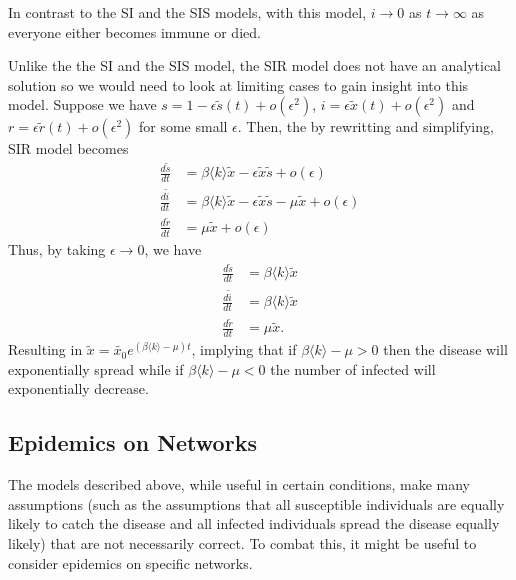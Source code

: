 \documentclass[
]{article}
\theoremstyle{definition}
\theoremstyle{definition}
\begin{document}
In contrast to the SI and the SIS models, with this model, \(i \to 0\)
as \(t \to \infty\) as everyone either becomes immune or died.

Unlike the the SI and the SIS model, the SIR model does not have an
analytical solution so we would need to look at limiting cases to gain
insight into this model. Suppose we have
\(s = 1 - \epsilon \tilde{s}(t) + o(\epsilon^2)\),
\(i = \epsilon \tilde{x}(t) + o(\epsilon^2)\) and
\(r = \epsilon \tilde{r}(t) + o(\epsilon^2)\) for some small
\(\epsilon\). Then, the by rewritting and simplifying, SIR model becomes
\begin{align*}
  \frac{d\tilde{s}}{dt} & = \beta \langle k \rangle \tilde{x} - 
    \epsilon \tilde{x} \tilde{s} + o(\epsilon)\\
  \frac{d\tilde{i}}{dt} & = \beta \langle k \rangle \tilde{x} - 
    \epsilon \tilde{x} \tilde{s} - \mu \tilde{x} + o(\epsilon)\\
  \frac{d\tilde{r}}{dt} & = \mu \tilde{x} + o(\epsilon)
\end{align*} Thus, by taking \(\epsilon \to 0\), we have \begin{align*}
  \frac{d\tilde{s}}{dt} & = \beta \langle k \rangle \tilde{x}\\
  \frac{d\tilde{i}}{dt} & = \beta \langle k \rangle \tilde{x}\\
  \frac{d\tilde{r}}{dt} & = \mu \tilde{x}.
\end{align*} Resulting in
\(\tilde{x} = \tilde{x_0}e^{(\beta \langle k \rangle - \mu)t}\),
implying that if \(\beta \langle k \rangle - \mu > 0\) then the disease
will exponentially spread while if \(\beta \langle k \rangle - \mu < 0\)
the number of infected will exponentially decrease.

\hypertarget{epidemics-on-networks}{%
\subsection{Epidemics on Networks}\label{epidemics-on-networks}}

The models described above, while useful in certain conditions, make
many assumptions (such as the assumptions that all susceptible
individuals are equally likely to catch the disease and all infected
individuals spread the disease equally likely) that are not necessarily
correct. To combat this, it might be useful to consider epidemics on
specific networks.
\end{document}
